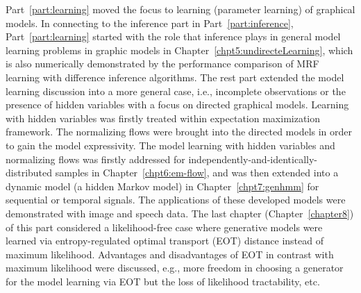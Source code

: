 Part~\ref{part:learning} moved the focus to learning (parameter learning) of graphical models. In connecting to the inference part in Part~\ref{part:inference}, Part~\ref{part:learning} started with the role that inference plays in general model learning problems in graphic models in Chapter~\ref{chpt5:undirecteLearning}, which is also numerically demonstrated by the performance comparison of MRF learning with difference inference algorithms. The rest part extended the model learning discussion into a more general case, i.e., incomplete observations or the presence of hidden variables with a focus on directed graphical models. Learning with hidden variables was firstly treated within expectation maximization framework. The normalizing flows were brought into the directed models in order to gain the model expressivity. The model learning with hidden variables and normalizing flows was firstly addressed for independently-and-identically-distributed samples in Chapter~\ref{chpt6:em-flow}, and was then extended into a dynamic model (a hidden Markov model) in Chapter~\ref{chpt7:genhmm} for sequential or temporal signals. The applications of these developed models were demonstrated with image and speech data. The last chapter (Chapter~\ref{chapter8}) of this part considered a likelihood-free case where generative models were learned via entropy-regulated optimal transport (EOT) distance instead of maximum likelihood. Advantages and disadvantages of EOT in contrast with maximum likelihood were discussed, e.g., more freedom in choosing a generator for the model learning via EOT but the loss of likelihood tractability, etc.

